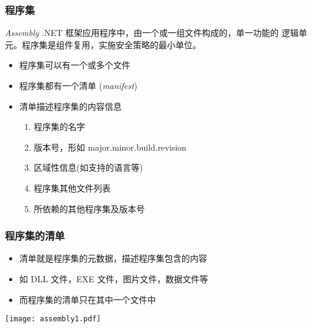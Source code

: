 \begin{frame}
\frametitle{程序集}
\begin{block}{\textit{Assembly}}
  \CJKindent \small .NET 框架应用程序中，由一个或一组文件构成的，单一功能的
  逻辑单元。程序集是组件复用，实施安全策略的最小单位。
\end{block}
\pause
\begin{itemize}
\item 程序集可以有一个或多个文件
\item 程序集都有一个{清单} (\textit{manifest}{})
\item 清单描述程序集的内容信息
  \begin{enumerate}
  \item 程序集的名字
  \item 版本号，形如 major.minor.build.revision
  \item 区域性信息(如支持的语言等)
  \item 程序集其他文件列表
  \item 所依赖的其他程序集及版本号
  \end{enumerate}
\end{itemize}
\end{frame}

\begin{frame}[t]
\frametitle{程序集的清单}

\begin{itemize}
\item 清单就是程序集的元数据，描述程序集包含的内容
\item 如 DLL 文件，EXE 文件，图片文件，数据文件等
\item 而程序集的清单只在其中一个文件中
\end{itemize}

  \begin{center}
    \texttt{[image: assembly1.pdf]}
  \end{center}
\end{frame}

